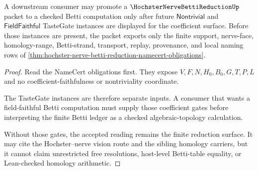 \begin{theorem}
\label{thm:hochster-nerve-betti-reduction-tastegate-boundary}
A downstream consumer may promote a $\HochsterNerveBettiReductionUp$ packet to a checked Betti computation only after future $\mathsf{Nontrivial}$ and $\mathsf{FieldFaithful}$ TasteGate instances are displayed for the coefficient surface. Before those instances are present, the packet exports only the finite support, nerve-face, homology-range, Betti-strand, transport, replay, provenance, and local naming rows of \autoref{thm:hochster-nerve-betti-reduction-namecert-obligations}.
\end{theorem}
\begin{proof}
Read the NameCert obligations first. They expose $V,F,N,H_0,B_0,G,T,P,L$ and no coefficient-faithfulness or nontriviality coordinate.

The TasteGate instances are therefore separate inputs. A consumer that wants a field-faithful Betti computation must supply those coefficient gates before interpreting the finite Betti ledger as a checked algebraic-topology calculation.

Without those gates, the accepted reading remains the finite reduction surface. It may cite the Hochster--nerve vision route and the sibling homology carriers, but it cannot claim unrestricted free resolutions, host-level Betti-table equality, or Lean-checked homology arithmetic.
\end{proof}




